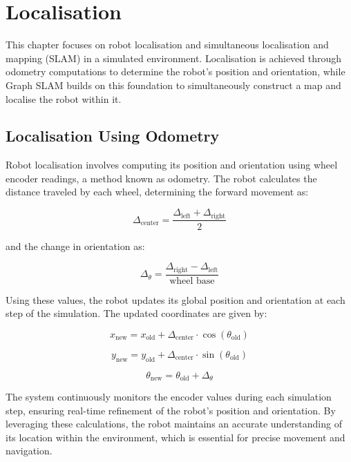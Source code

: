 \chapter{Localisation}

This chapter focuses on robot localisation and simultaneous localisation and mapping (SLAM) in a simulated environment. Localisation is achieved through odometry computations to determine the robot's position and orientation, while Graph SLAM builds on this foundation to simultaneously construct a map and localise the robot within it.

\section{Localisation Using Odometry}

Robot localisation involves computing its position and orientation using wheel encoder readings, a method known as odometry. The robot calculates the distance traveled by each wheel, determining the forward movement as:

\[
\Delta_{\text{center}} = \frac{\Delta_{\text{left}} + \Delta_{\text{right}}}{2}
\]

and the change in orientation as:

\[
\Delta_{\theta} = \frac{\Delta_{\text{right}} - \Delta_{\text{left}}}{\text{wheel base}}
\]

Using these values, the robot updates its global position and orientation at each step of the simulation. The updated coordinates are given by:

\[
x_{\text{new}} = x_{\text{old}} + \Delta_{\text{center}} \cdot \cos(\theta_{\text{old}})
\]

\[
y_{\text{new}} = y_{\text{old}} + \Delta_{\text{center}} \cdot \sin(\theta_{\text{old}})
\]

\[
\theta_{\text{new}} = \theta_{\text{old}} + \Delta_{\theta}
\]

The system continuously monitors the encoder values during each simulation step, ensuring real-time refinement of the robot's position and orientation. By leveraging these calculations, the robot maintains an accurate understanding of its location within the environment, which is essential for precise movement and navigation.


